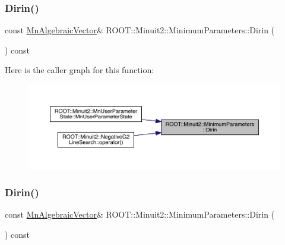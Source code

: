 \subsubsection{\texorpdfstring{Dirin()}{Dirin()}\hspace{0.1cm}{\footnotesize\ttfamily [1/2]}}
{\footnotesize\ttfamily const \mbox{\hyperlink{namespaceROOT_1_1Minuit2_a62ed97730a1ca8d3fbaec64a19aa11c9}{Mn\+Algebraic\+Vector}}\& R\+O\+O\+T\+::\+Minuit2\+::\+Minimum\+Parameters\+::\+Dirin (\begin{DoxyParamCaption}{ }\end{DoxyParamCaption}) const\hspace{0.3cm}{\ttfamily [inline]}}

Here is the caller graph for this function\+:\nopagebreak
\begin{figure}[H]
\begin{center}
\leavevmode
\includegraphics[width=350pt]{db/db8/classROOT_1_1Minuit2_1_1MinimumParameters_a2c5c5f0add9ecbdf6b5d4ff962d68d15_icgraph}
\end{center}
\end{figure}
\mbox{\label{classROOT_1_1Minuit2_1_1MinimumParameters_a2c5c5f0add9ecbdf6b5d4ff962d68d15}} 
\subsubsection{\texorpdfstring{Dirin()}{Dirin()}\hspace{0.1cm}{\footnotesize\ttfamily [2/2]}}
{\footnotesize\ttfamily const \mbox{\hyperlink{namespaceROOT_1_1Minuit2_a62ed97730a1ca8d3fbaec64a19aa11c9}{Mn\+Algebraic\+Vector}}\& R\+O\+O\+T\+::\+Minuit2\+::\+Minimum\+Parameters\+::\+Dirin (\begin{DoxyParamCaption}{ }\end{DoxyParamCaption}) const\hspace{0.3cm}{\ttfamily [inline]}}

